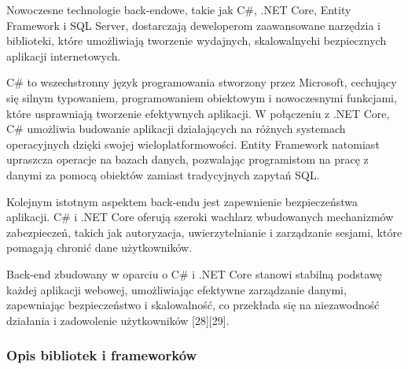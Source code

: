  Nowoczesne technologie back-endowe, takie jak C\#, .NET Core, Entity Framework i SQL Server, dostarczają deweloperom zaawansowane narzędzia i biblioteki, które umożliwiają tworzenie wydajnych, skalowalnych\linebreak i bezpiecznych aplikacji internetowych.

C\# to wszechstronny język programowania stworzony przez Microsoft, cechujący się silnym typowaniem, programowaniem obiektowym i nowoczesnymi funkcjami, które usprawniają tworzenie efektywnych aplikacji. W połączeniu z .NET Core, C\# umożliwia budowanie aplikacji działających na różnych systemach operacyjnych dzięki swojej wieloplatformowości. Entity Framework natomiast upraszcza operacje na bazach danych, pozwalając programistom na pracę z danymi za pomocą obiektów zamiast tradycyjnych zapytań SQL.

Kolejnym istotnym aspektem back-endu jest zapewnienie bezpieczeństwa aplikacji. C\# i .NET Core oferują szeroki wachlarz wbudowanych mechanizmów zabezpieczeń, takich jak autoryzacja, uwierzytelnianie i zarządzanie sesjami, które pomagają chronić dane użytkowników. 

Back-end zbudowany w oparciu o C\# i .NET Core stanowi stabilną podstawę każdej aplikacji webowej, umożliwiając efektywne zarządzanie danymi, zapewniając bezpieczeństwo i skalowalność, co przekłada się na niezawodność działania i zadowolenie użytkowników [28][29].
\subsubsection{Opis bibliotek i frameworków}

